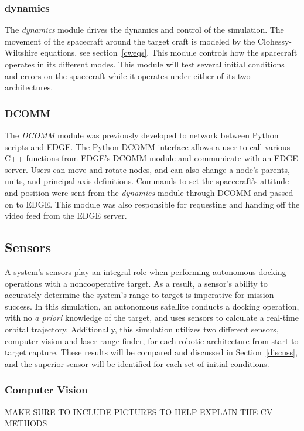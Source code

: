 \documentclass[journal, 10pt]{IEEEtran}
\begin{document}
\subsubsection{dynamics}
The \textit{dynamics} module drives the dynamics and control of the simulation. The movement of the spacecraft around the target craft is modeled by the Clohessy-Wiltshire equations, see section~\ref{cweqs}. This module controls how the spacecraft operates in its different modes. This module will test several initial conditions and errors on the spacecraft while it operates under either of its two architectures.

\subsubsection{DCOMM}
The \textit{DCOMM} module was previously developed to network between Python scripts and EDGE. The Python DCOMM interface allows a user to call various C++ functions from EDGE's DCOMM module and communicate with an EDGE server. Users can move and rotate nodes, and can also change a node's parents, units, and principal axis definitions. Commands to set the spacecraft's attitude and position were sent from the \textit{dynamics} module through DCOMM and passed on to EDGE. This module was also responsible for requesting and handing off the video feed from the EDGE server.

\subsection{Sensors}
A system's sensors play an integral role when performing autonomous docking operations with a noncooperative target. As a result, a sensor's ability to accurately determine the system's range to target is imperative for mission success. In this simulation, an autonomous satellite conducts a docking operation, with no \textit{a priori} knowledge of the target, and uses sensors to calculate a real-time orbital trajectory. Additionally, this simulation utilizes two different sensors, computer vision and laser range finder, for each robotic architecture from start to target capture. These results will be compared and discussed in Section~\ref{discuss}, and the superior sensor will be identified for each set of initial conditions. 

\subsubsection{Computer Vision} \label{cv}
MAKE SURE TO INCLUDE PICTURES TO HELP EXPLAIN THE CV METHODS\\
\end{document}
